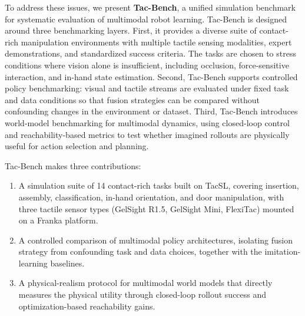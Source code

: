 \documentclass{article}
\newcommand{\weihan}[1]{\textcolor{purple}{\textbf{weihan}: #1}}
\begin{document}
To address these issues, we present \textbf{Tac-Bench}, a unified simulation benchmark for systematic evaluation of multimodal robot learning. Tac-Bench is designed around three benchmarking layers.
First, it provides a diverse suite of contact-rich manipulation environments with multiple tactile sensing modalities, expert demonstrations, and standardized success criteria. The tasks are chosen to stress conditions where vision alone is insufficient, including occlusion, force-sensitive interaction, and in-hand state estimation.
Second, Tac-Bench supports controlled policy benchmarking: visual and tactile streams are evaluated under fixed task and data conditions so that fusion strategies can be compared without confounding changes in the environment or dataset.
Third, Tac-Bench introduces world-model benchmarking for multimodal dynamics, using closed-loop control and reachability-based metrics to test whether imagined rollouts are physically useful for action selection and planning.

Tac-Bench makes three contributions:
\begin{enumerate}[label=(\arabic*)]
    \item A simulation suite of 14 contact-rich tasks built on \mbox{TacSL}, covering insertion, assembly, classification, in-hand orientation, and door manipulation, with three tactile sensor types (GelSight R1.5, GelSight Mini, FlexiTac) mounted on a Franka platform.
    \item A controlled comparison of multimodal policy architectures, isolating fusion strategy from confounding task and data choices, together with the imitation-learning baselines.
    \item A physical-realism protocol for multimodal world models that directly measures the physical utility through closed-loop rollout success and optimization-based reachability gains.
\end{enumerate}
\end{document}
